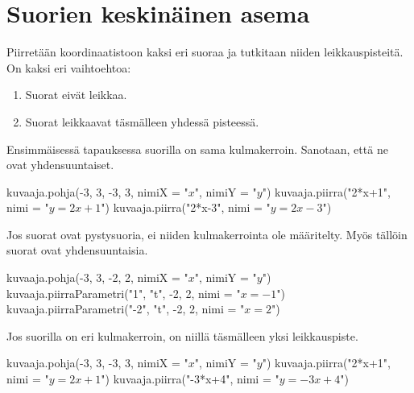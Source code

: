 \section{Suorien keskinäinen asema}


Piirretään koordinaatistoon kaksi eri suoraa ja tutkitaan niiden leikkauspisteitä.
On kaksi eri vaihtoehtoa:
\begin{enumerate}
 \item Suorat eivät leikkaa.
 \item Suorat leikkaavat täsmälleen yhdessä pisteessä.
\end{enumerate}

Ensimmäisessä tapauksessa suorilla on sama kulmakerroin. Sanotaan, että ne ovat yhdensuuntaiset.

\begin{kuva}
    kuvaaja.pohja(-3, 3, -3, 3, nimiX = "$x$", nimiY = "$y$")
    kuvaaja.piirra("2*x+1", nimi = "$y=2x+1$")
    kuvaaja.piirra("2*x-3", nimi = "$y=2x-3$")
\end{kuva}

Jos suorat ovat pystysuoria, ei niiden kulmakerrointa ole määritelty. Myös tällöin suorat ovat yhdensuuntaisia.

\begin{kuva}
    kuvaaja.pohja(-3, 3, -2, 2, nimiX = "$x$", nimiY = "$y$")
    kuvaaja.piirraParametri("1", "t", -2, 2, nimi = "$x=-1$")
    kuvaaja.piirraParametri("-2", "t", -2, 2, nimi = "$x=2$")
\end{kuva}


Jos suorilla on eri kulmakerroin, on niillä täsmälleen yksi leikkauspiste. 

\begin{kuva}
    kuvaaja.pohja(-3, 3, -3, 3, nimiX = "$x$", nimiY = "$y$")
    kuvaaja.piirra("2*x+1", nimi = "$y=2x+1$")
    kuvaaja.piirra("-3*x+4", nimi = "$y=-3x+4$")
\end{kuva}

